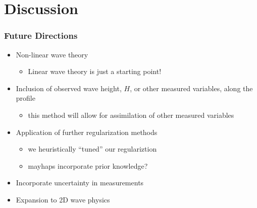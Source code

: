 \documentclass[7pt]{beamer}
\begin{document}
\section{Discussion}

\begin{frame}
	\frametitle{Future Directions}
		\begin{itemize}
			 \item Non-linear wave theory
			 	\begin{itemize}
				 	\item Linear wave theory is just a starting point!
			 	\end{itemize}
			 \item Inclusion of observed wave height, $H$, or other measured variables, along the profile
			 	\begin{itemize}
				 	\item this method will allow for assimilation of other measured variables
			 	\end{itemize}
			 \item Application of further regularization methods
			 	\begin{itemize}
				 	\item we heuristically ``tuned'' our regulariztion
				 	\item mayhaps incorporate prior knowledge?
			 	\end{itemize}
			 \item Incorporate uncertainty in measurements
			 \item Expansion to 2D wave physics
		\end{itemize}
\end{frame}
\end{document}
